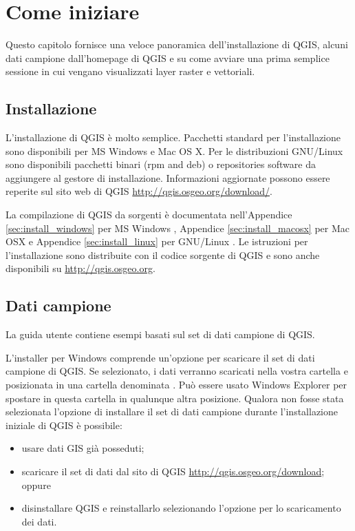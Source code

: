 
\section{Come iniziare}\label{label_getstarted}


Questo capitolo fornisce una veloce panoramica dell'installazione
di QGIS, alcuni dati campione dall'homepage di QGIS e su come avviare
una prima semplice sessione in cui vengano visualizzati layer raster
e vettoriali.

\subsection{Installazione}\label{label_installation}

L'installazione di QGIS è molto semplice. Pacchetti standard per l'installazione
sono disponibili per MS Windows e Mac OS X. Per le distribuzioni GNU/Linux
sono disponibili pacchetti binari (rpm and deb) o repositories software
da aggiungere al gestore di installazione. Informazioni aggiornate
possono essere reperite sul sito web di QGIS \url{http://qgis.osgeo.org/download/}.

La compilazione di QGIS da sorgenti è documentata nell'Appendice \ref{sec:install_windows}
per MS Windows \win, Appendice \ref{sec:install_macosx} per Mac
OSX \osx e Appendice \ref{sec:install_linux} per GNU/Linux \nix.
Le istruzioni per l'installazione sono distribuite con il codice sorgente
di QGIS e sono anche disponibili su \url{http://qgis.osgeo.org}.

\subsection{Dati campione}\label{label_sampledata}

La guida utente contiene esempi basati sul set di dati campione di
QGIS.

\win L'installer per Windows comprende un'opzione per scaricare il
set di dati campione di QGIS. Se selezionato, i dati verranno scaricati
nella vostra cartella  e posizionata in
una cartella denominata . Può essere usato
Windows Explorer per spostare in questa cartella in qualunque altra
posizione. Qualora non fosse stata selezionata l'opzione di installare
il set di dati campione durante l'installazione iniziale di QGIS è
possibile: 
\begin{itemize}
\item usare dati GIS già posseduti; 
\item scaricare il set di dati dal sito di QGIS \url{http://qgis.osgeo.org/download};
oppure 
\item disinstallare QGIS e reinstallarlo selezionando l'opzione per lo scaricamento
dei dati. 
\end{itemize}


